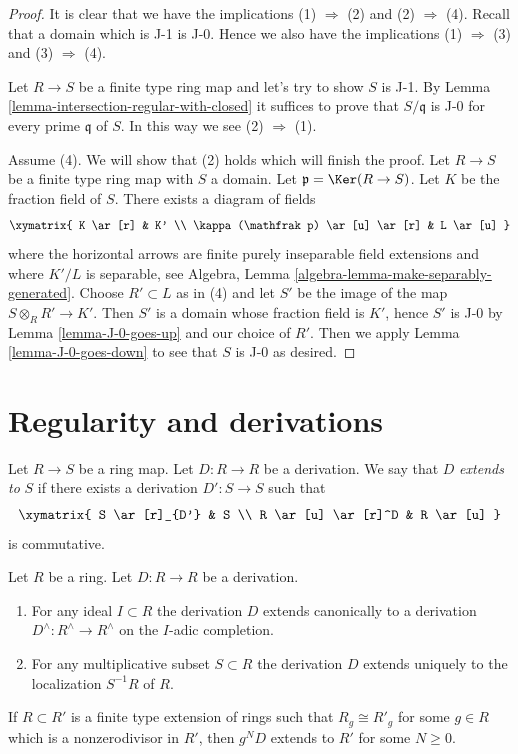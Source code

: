 \begin{proof}
It is clear that we have the implications (1) $\Rightarrow$ (2) and
(2) $\Rightarrow$ (4). Recall that a domain which is
J-1 is J-0. Hence we also have the implications
(1) $\Rightarrow$ (3) and (3) $\Rightarrow$ (4).

\medskip\noindent
Let $R \to S$ be a finite type ring map and let's try to show $S$ is J-1. By
Lemma \ref{lemma-intersection-regular-with-closed} it suffices
to prove that $S/\mathfrak q$ is J-0 for every prime $\mathfrak q$
of $S$. In this way we see (2) $\Rightarrow$ (1).

\medskip\noindent
Assume (4). We will show that (2) holds which will finish the proof.
Let $R \to S$ be a finite type ring map with $S$ a domain.
Let $\mathfrak p = \Ker(R \to S)$. Let $K$ be the fraction field of $S$.
There exists a diagram of fields
$$
\xymatrix{
K \ar[r] & K' \\
\kappa(\mathfrak p) \ar[u] \ar[r] & L \ar[u]
}
$$
where the horizontal arrows are finite purely inseparable field extensions
and where $K'/L$ is separable, see
Algebra, Lemma \ref{algebra-lemma-make-separably-generated}.
Choose $R' \subset L$ as in (4) and let
$S'$ be the image of the map $S \otimes_R R' \to K'$.
Then $S'$ is a domain whose fraction field is $K'$, hence
$S'$ is J-0 by Lemma \ref{lemma-J-0-goes-up} and our choice of $R'$.
Then we apply Lemma \ref{lemma-J-0-goes-down} to see that $S$
is J-0 as desired.
\end{proof}



\section{Regularity and derivations}
\label{section-regularity-derivations}

\noindent
Let $R \to S$ be a ring map. Let $D : R \to R$ be a derivation.
We say that $D$ {\it extends to} $S$
if there exists a derivation $D' : S \to S$ such that
$$
\xymatrix{
S \ar[r]_{D'} & S \\
R \ar[u] \ar[r]^D & R \ar[u]
}
$$
is commutative.

\begin{lemma}
\label{lemma-derivation-extends}
Let $R$ be a ring. Let $D : R \to R$ be a derivation.
\begin{enumerate}
\item For any ideal $I \subset R$ the derivation $D$ extends
canonically to a derivation $D^\wedge : R^\wedge \to R^\wedge$
on the $I$-adic completion.
\item For any multiplicative subset $S \subset R$ the derivation
$D$ extends uniquely to the localization $S^{-1}R$ of $R$.
\end{enumerate}
If $R \subset R'$ is a finite type extension of rings such that
$R_g \cong R'_g$ for some $g \in R$ which is a nonzerodivisor in $R'$,
then $g^ND$ extends to $R'$ for some $N \geq 0$.
\end{lemma}

